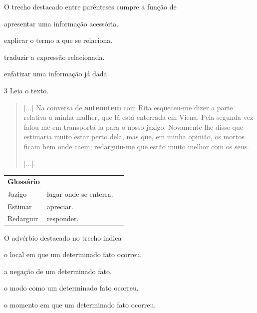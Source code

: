 \pagebreak
O trecho destacado entre parênteses cumpre a função de

\begin{minipage}{.5\textwidth}
\begin{escolha}
\item apresentar uma informação acessória.

\item explicar o termo a que se relaciona.

\item traduzir a expressão relacionada.

\item enfatizar uma informação já dada.
\end{escolha}
\end{minipage}

\num{3} Leia o texto.

\begin{quote}
{[}...{]} Na conversa de \textbf{anteontem} com Rita esqueceu-me dizer
a parte relativa a minha mulher, que lá está enterrada em Viena. Pela
segunda vez falou-me em transportá-la para o nosso jazigo. Novamente lhe
disse que estimaria muito estar perto dela, mas que, em minha opinião,
os mortos ficam bem onde caem; redarguiu-me que estão muito melhor com
os seus.

{[}...{]}.

\end{quote}

\begin{tabular}{lll}
\textbf{Glossário} & \mbox{}\\
Jazigo & lugar onde se enterra.\\
Estimar & apreciar.\\
Redarguir & responder.\\
\end{tabular}\bigskip

O advérbio destacado no trecho indica

\begin{escolha}
\item o local em que um determinado fato ocorreu.

\item a negação de um determinado fato.

\item o modo como um determinado fato ocorreu.

\item o momento em que um determinado fato ocorreu.
\end{escolha}

